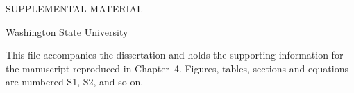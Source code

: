 \documentclass[11pt,letterpaper,oneside]{report}
\begin{document}
\begin{center}
  SUPPLEMENTAL MATERIAL\par
  \vspace{\baselineskip}
  {\doublespacing\MakeUppercase{\thesistitle}\par}
  \vspace{\baselineskip}
  \thesisauthor\par
  Washington State University\par
  \thesisdate\par
\end{center}
\vspace{\baselineskip}
\noindent This file accompanies the dissertation and holds the supporting information for the manuscript reproduced in Chapter~4. Figures, tables, sections and equations are numbered S1, S2, and so on.



\printbibliography[heading=bibliography,title={REFERENCES}]
\end{document}
